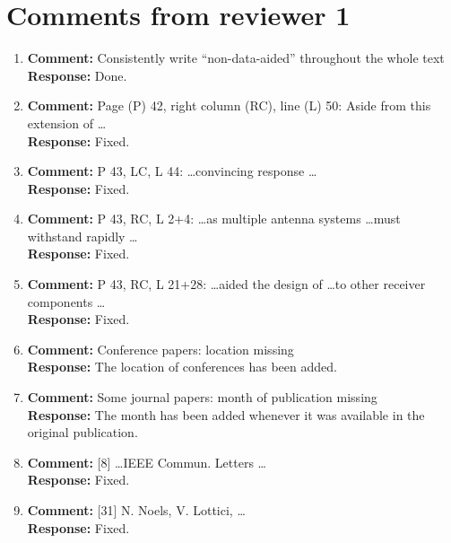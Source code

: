 \documentclass{article}
\begin{document}
\section{Comments from reviewer 1}

\begin{enumerate}

\item \textbf{Comment:} Consistently write ``non-data-aided'' throughout the whole text \\
\textbf{Response:} Done.

\item \textbf{Comment:} Page (P) 42, right column (RC), line (L) 50: Aside from this extension of \dots \\
\textbf{Response:} Fixed.


\item \textbf{Comment:} P 43, LC, L 44: \dots convincing response \dots \\
\textbf{Response:} Fixed.

\item \label{eq:rev1:multantenna} \textbf{Comment:} P 43, RC, L 2+4: \dots as multiple antenna systems \dots must withstand rapidly \dots \\
\textbf{Response:} Fixed.

\item \textbf{Comment:} P 43, RC, L 21+28: \dots aided the design of \dots to other receiver components \dots \\
\textbf{Response:} Fixed.

\item \textbf{Comment:} Conference papers: location missing \\
\textbf{Response:} The location of conferences has been added.

\item \textbf{Comment:} Some journal papers: month of publication missing \\
\textbf{Response:} The month has been added whenever it was available in the original publication. 

\item \textbf{Comment:} [8] \dots IEEE Commun. Letters \dots \\
\textbf{Response:} Fixed.

\item \textbf{Comment:} [31] N. Noels, V. Lottici, \dots \\
\textbf{Response:} Fixed.

\end{enumerate}
\end{document}
